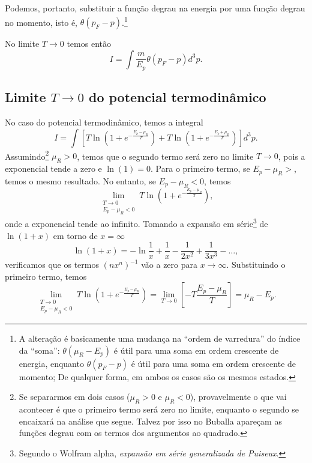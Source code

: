 Podemos, portanto, substituir a função degrau na energia por uma função degrau no momento, isto é, $\theta(p_F - p)$.\footnote{A alteração é basicamente uma mudança na ``ordem de varredura'' do índice da ``soma'': $\theta(\mu_R - E_p)$ é útil para uma soma em ordem crescente de energia, enquanto $\theta(p_F - p)$ é útil para uma soma em ordem crescente de momento; De qualquer forma, em ambos os casos são os mesmos estados.}

No limite $T \to 0$ temos então
\begin{equation}
	I = \int \frac{m}{E_p} \theta(p_F - p) d^3p.
\end{equation}

\subsection{Limite $T \to 0$ do potencial termodinâmico}

No caso do potencial termodinâmico, temos a integral
\begin{equation}
	I = \int [T \ln(1+e^{-\frac{E_p - \mu_R}{T}}) + T\ln(1+e^{-\frac{E_p + \mu_R}{T}})] d^3p.
\end{equation}
%
Assumindo\footnote{Se separarmos em dois casos ($\mu_R > 0$ e $\mu_R < 0$), provavelmente o que vai acontecer é que o primeiro termo será zero no limite, enquanto o segundo se encaixará na análise que segue. Talvez por isso no Buballa apareçam as funções degrau com os termos dos argumentos ao quadrado.} $\mu_R > 0$, temos que o segundo termo será zero no limite $T \to 0$, pois a exponencial tende a zero e $\ln(1) = 0$. Para o primeiro termo, se $E_p - \mu_R >$, temos o mesmo resultado. No entanto, se $E_p - \mu_R < 0$, temos
\begin{equation}
	\lim_{\substack{T \to 0 \\ E_p - \mu_R < 0}} T \ln(1+e^{-\frac{E_p - \mu_R}{T}}),
\end{equation}
%
onde a exponencial tende ao infinito. Tomando a expansão em série\footnote{Segundo o Wolfram alpha, \emph{expansão em série generalizada de Puiseux}.} de $\ln(1 + x)$ em torno de $x = \infty$
\begin{equation}
	\ln(1 + x) = -\ln\frac{1}{x} + \frac{1}{x} - \frac{1}{2x^2} + \frac{1}{3x^3} - \dots,
\end{equation}
%
verificamos que os termos $(n x^n)^{-1}$ vão a zero para $x \to \infty$. Substituindo o primeiro termo, temos
\begin{equation}
	\lim_{\substack{T \to 0 \\ E_p - \mu_R < 0}} T \ln(1+e^{-\frac{E_p - \mu_R}{T}}) = \lim_{T \to 0} \left[-T \frac{E_p - \mu_R}{T} \right] = \mu_R - E_p.
\end{equation}
%

